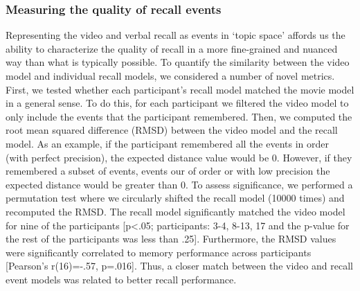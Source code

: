 \documentclass[a4paper,man,natbib,floatsintext]{apa6}
\begin{document}
\subsubsection{Measuring the quality of recall events}
Representing the video and verbal recall as events in `topic space' affords us the ability to characterize the quality of recall in a more fine-grained and nuanced way than what is typically possible. To quantify the similarity between the video model and individual recall models, we considered a number of novel metrics.  First, we tested whether each participant's recall model matched the movie model in a general sense. To do this, for each participant we filtered the video model to only include the events that the participant remembered. Then, we computed the root mean squared difference (RMSD) between the video model and the recall model. As an example, if the participant remembered all the events in order (with perfect precision), the expected distance value would be 0. However, if they remembered a subset of events, events our of order or with low precision the expected distance would be greater than 0. To assess significance, we performed a permutation test where we circularly shifted the recall model (10000 times) and recomputed the RMSD. The recall model significantly matched the video model for nine of the participants [p<.05; participants: 3-4, 8-13, 17 and the p-value for the rest of the participants was less than .25]. Furthermore, the RMSD values were significantly correlated to memory performance across participants [Pearson's r(16)=-.57, p=.016]. Thus, a closer match between the video and recall event models was related to better recall performance.

\end{document}
